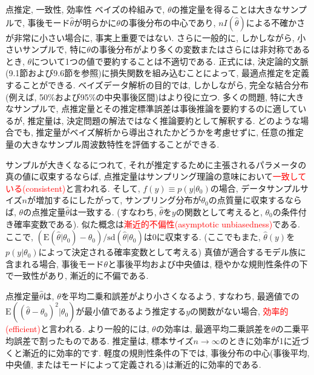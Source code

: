 \documentclass[10pt,dvipdfmx,a4]{beamer}
\newcommand{\tcr}[1]{\textcolor{red}{#1}}
\begin{document}

\begin{frame}{点推定, 一致性, 効率性}
ベイズの枠組みで, $\theta$の推定量を得ることは大きなサンプルで, 事後モード$\hat{\theta}$が明らかに$\theta$の事後分布の中心であり, $nI(\hat{\theta})$による不確かさが非常に小さい場合に, 事実上重要ではない.
さらに一般的に, しかしながら, 小さいサンプルで, 特に$\theta$の事後分布がより多くの変数またはさらには非対称であるとき, $\theta$について1つの値で要約することは不適切である.
正式には, 決定論的文脈(9.1節および9.6節を参照)に損失関数を組み込むことによって, 最適点推定を定義することができる.
ベイズデータ解析の目的では, しかしながら, 完全な結合分布(例えば, 50\%および95\%の中央事後区間)はより役に立つ.
多くの問題, 特に大きなサンプルで, 点推定量とその推定標準誤差は事後推論を要約するのに適しているが, 推定量は, 決定問題の解法ではなく推論要約として解釈する.
どのような場合でも, 推定量がベイズ解析から導出されたかどうかを考慮せずに, 任意の推定量の大きなサンプル周波数特性を評価することができる.
\end{frame}


\begin{frame}
サンプルが大きくなるにつれて, それが推定するために主張されるパラメータの真の値に収束するならば, 点推定量はサンプリング理論の意味において\tcr{一致している(consistent)}と言われる.
そして, $f(y)\equiv p(y|\theta_0)$の場合, データサンプルサイズ$n$が増加するにしたがって, サンプリング分布が$\theta_0$の点質量に収束するならば, $\theta$の点推定量$\hat{\theta}$は一致する.
(すなわち, $\hat{\theta}$を$y$の関数として考えると, $\theta_0$の条件付き確率変数である).
似た概念は\tcr{漸近的不偏性(asymptotic unbiasedness)}である.
ここで, $(\text{E}(\hat{\theta}|\theta_0)-\theta_0)/\text{sd}(\hat{\theta}|\theta_0)$は0に収束する.
(ここでもまた, $\hat{\theta}(y)$を$p(y|\theta_0)$によって決定される確率変数として考える)
真値が適合するモデル族に含まれる場合, 事後モード$\theta$と事後平均および中央値は, 穏やかな規則性条件の下で一致性があり, 漸近的に不偏である.

点推定量$\hat{\theta}$は, $\theta$を平均二乗和誤差がより小さくなるよう, すなわち, 最適値での$\text{E}((\hat{\theta}-\theta_0)^2|\theta_0)$が最小値であるよう推定する$y$の関数がない場合, \tcr{効率的(efficient)}と言われる.
より一般的には, $\theta$の効率は, 最適平均二乗誤差を$\theta$の二乗平均誤差で割ったものである.
推定量は, 標本サイズ$n\rightarrow \infty$のときに効率が1に近づくと漸近的に効率的です.
軽度の規則性条件の下では, 事後分布の中心(事後平均, 中央値, またはモードによって定義される)は漸近的に効率的である.
\end{frame}
\end{document}
